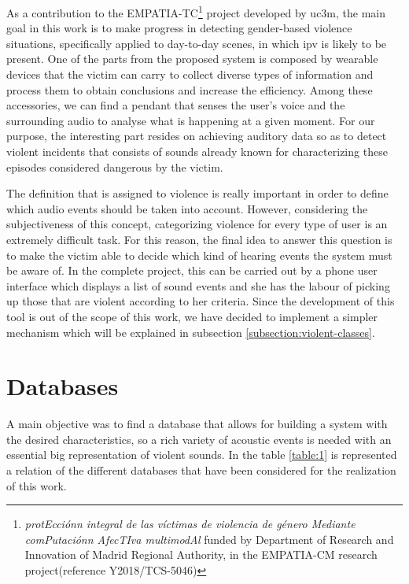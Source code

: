 	As a contribution to the EMPATIA-TC\footnote{\textit{protEcciónn integral de las víctimas de violencia de género Mediante comPutaciónn AfecTIva multimodAl} funded by Department  of  Research  and Innovation of Madrid Regional Authority, in the EMPATIA-CM research project(reference  Y2018/TCS-5046)} project developed by \acrlong{uc3m}, the main goal in this work is to make progress in detecting gender-based violence situations, specifically applied to day-to-day scenes, in which \acrshort{ipv} is likely to be present. One of the parts from the proposed system is composed by wearable devices that the victim can carry to collect diverse types of information and process them to obtain conclusions and increase the efficiency. Among these accessories, we can find a pendant that senses the user's voice and the surrounding audio to analyse what is happening at a given moment. For our purpose, the interesting part resides on achieving auditory data so as to detect violent incidents that consists of sounds already known for characterizing these episodes considered dangerous by the victim.
	
	The definition that is assigned to violence is really important in order to define which audio events should be taken into account. However, considering the subjectiveness of this concept, categorizing violence for every type of user is an extremely difficult task. For this reason, the final idea to answer this question is to make the victim able to decide which kind of hearing events the system must be aware of. In the complete project, this can be carried out by a phone user interface which displays a list of sound events and she has the labour of picking up those that are violent according to her criteria. Since the development of this tool is out of the scope of this work, we have decided to implement a simpler mechanism which will be explained in subsection \ref{subsection:violent-classes}.
		

\section{Databases}

	A main objective was to find a database that allows for building a system with the desired characteristics, so a rich variety of acoustic events is needed with an essential big representation of violent sounds. In the table \ref{table:1} is represented a relation of the different databases that have been considered for the realization of this work.
	
